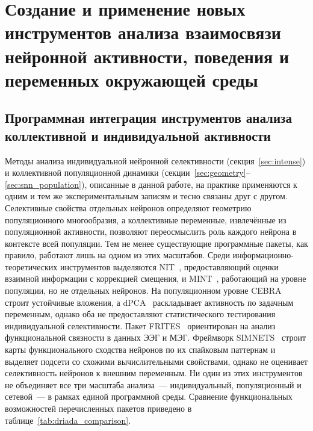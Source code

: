 \chapter{Создание и применение новых инструментов анализа взаимосвязи нейронной активности, поведения и переменных окружающей среды} \label{sec:individual}






\section{Программная интеграция инструментов анализа коллективной и индивидуальной активности}\label{sec:driada}



Методы анализа индивидуальной нейронной селективности (секция~\ref{sec:intense}) и коллективной популяционной динамики (секции~\ref{sec:geometry}--\ref{sec:snn_population}), описанные в данной работе, на практике применяются к одним и тем же экспериментальным записям и тесно связаны друг с другом. Селективные свойства отдельных нейронов определяют геометрию популяционного многообразия, а коллективные переменные, извлечённые из популяционной активности, позволяют переосмыслить роль каждого нейрона в контексте всей популяции. Тем не менее существующие программные пакеты, как правило, работают лишь на одном из этих масштабов. Среди информационно-теоретических инструментов выделяются NIT~\cite{Maffulli2024}, предоставляющий оценки взаимной информации с коррекцией смещения, и MINT~\cite{Lorenz2025}, работающий на уровне популяции, но не отдельных нейронов. На популяционном уровне CEBRA~\cite{Schneider2023} строит устойчивые вложения, а dPCA~\cite{Kobak2016} раскладывает активность по задачным переменным, однако оба не предоставляют статистического тестирования индивидуальной селективности. Пакет FRITES~\cite{Combrisson2022} ориентирован на анализ функциональной связности в данных ЭЭГ и МЭГ. Фреймворк SIMNETS~\cite{SIMNETS2025} строит карты функционального сходства нейронов по их спайковым паттернам и выделяет подсети со схожими вычислительными свойствами, однако не оценивает селективность нейронов к внешним переменным. Ни один из этих инструментов не объединяет все три масштаба анализа~--- индивидуальный, популяционный и сетевой~--- в рамках единой программной среды. Сравнение функциональных возможностей перечисленных пакетов приведено в таблице~\ref{tab:driada_comparison}.

